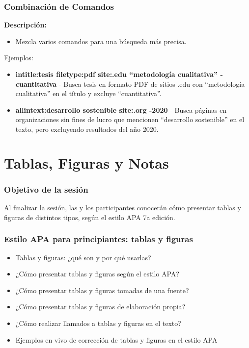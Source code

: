 \documentclass[
11pt, %
]{beamer}
\begin{document}
\begin{frame}
	\frametitle{Combinación de Comandos}
	\textbf{Descripción:}
	\begin{itemize}
		\item Mezcla varios comandos para una búsqueda más precisa.
	\end{itemize}
	\begin{exampleblock}{Ejemplos:}
		\begin{itemize}
			\item \textbf{intitle:tesis filetype:pdf site:.edu ``metodología cualitativa'' -cuantitativa} - Busca tesis en formato PDF de sitios .edu con ``metodología cualitativa'' en el título y excluye ``cuantitativa''.
			\item \textbf{allintext:desarrollo sostenible site:.org -2020} - Busca páginas en organizaciones sin fines de lucro que mencionen ``desarrollo sostenible'' en el texto, pero excluyendo resultados del año 2020.
		\end{itemize}
	\end{exampleblock}
\end{frame}

\section{Tablas, Figuras y Notas}

\begin{frame}
	\frametitle{Objetivo de la sesión}
	Al finalizar la sesión, las y los participantes conocerán cómo presentar tablas y figuras de distintos tipos, según el estilo APA 7a edición.
\end{frame}

\begin{frame}
	\frametitle{Estilo APA para principiantes: tablas y figuras}
	\begin{itemize}
		\item Tablas y figuras: ¿qué son y por qué usarlas?
		\item ¿Cómo presentar tablas y figuras según el estilo APA?
		\item ¿Cómo presentar tablas y figuras tomadas de una fuente?
		\item ¿Cómo presentar tablas y figuras de elaboración propia?
		\item ¿Cómo realizar llamados a tablas y figuras en el texto?
		\item Ejemplos en vivo de corrección de tablas y figuras en el estilo APA
	\end{itemize}
\end{frame}
\end{document}
